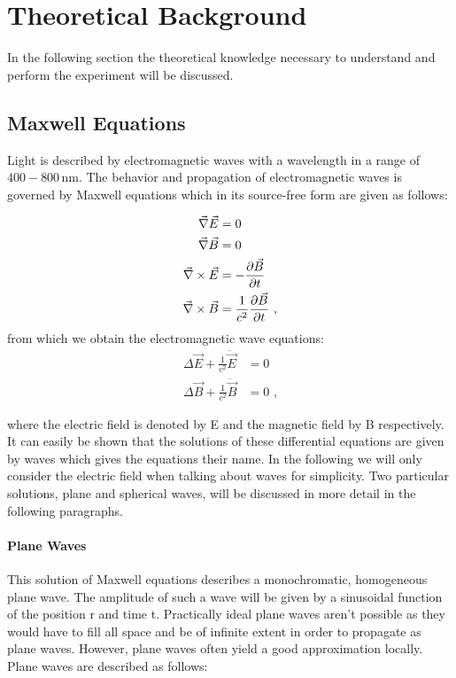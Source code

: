 \section{Theoretical Background}

In the following section the theoretical knowledge necessary to understand and perform the experiment will be discussed.

\subsection{Maxwell Equations}

Light is described by electromagnetic waves with a wavelength in a range of $400-800\,\mathrm{nm}$. The behavior and propagation of electromagnetic waves is governed by Maxwell equations which in its source-free form are given as follows:

\begin{align}
	\nab \vec{E}&=0\\
	\nab \vec{B}&=0\\
	\nab\times\vec{E}&=-\del[\vec B]{t}\\
	\nab\times\vec{B}&=\frac1{c^2}\del[\vec B]{t}\text{ ,}
\end{align}
from which we obtain the electromagnetic wave equations:
\begin{align}
	\Delta \vec{E} + \frac{1}{c^2} \ddot{\vec{E}}&= 0\\
	\Delta \vec{B} + \frac{1}{c^2} \ddot{\vec{B}}&= 0\text{ ,}
\end{align}

where the electric field is denoted by E and the magnetic field by B respectively. It can easily be shown that the solutions of these differential equations are given by waves which gives the equations their name.\cite{demtroeder2} In the following we will only consider the electric field when talking about waves for simplicity. Two particular solutions, plane and spherical waves, will be discussed in more detail in the following paragraphs.
\paragraph{Plane Waves}

This solution of Maxwell equations describes a monochromatic, homogeneous plane wave. The amplitude of such a wave will be given by a sinusoidal function of the position r and time t. Practically ideal plane waves aren't possible as they would have to fill all space and be of infinite extent in order to propagate as plane waves. However, plane waves often yield a good approximation locally. Plane waves are described as follows:

